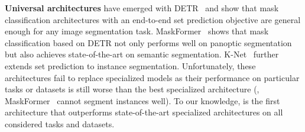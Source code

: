 \noindent\textbf{Universal architectures} have emerged with DETR~\cite{detr} and show that mask classification architectures with an end-to-end set prediction objective are general enough for any image segmentation task. 
MaskFormer~\cite{cheng2021maskformer} shows that mask classification based on DETR not only performs well on panoptic segmentation but also achieves state-of-the-art on semantic segmentation. K-Net~\cite{zhang2021knet} further extends set prediction to instance segmentation. Unfortunately, these architectures fail to replace specialized models as their performance on particular tasks or datasets is still worse than the best specialized architecture (\eg, MaskFormer~\cite{cheng2021maskformer} cannot segment instances well). To our knowledge, \modelname is the first
architecture that outperforms state-of-the-art specialized architectures on all considered tasks and datasets. %











